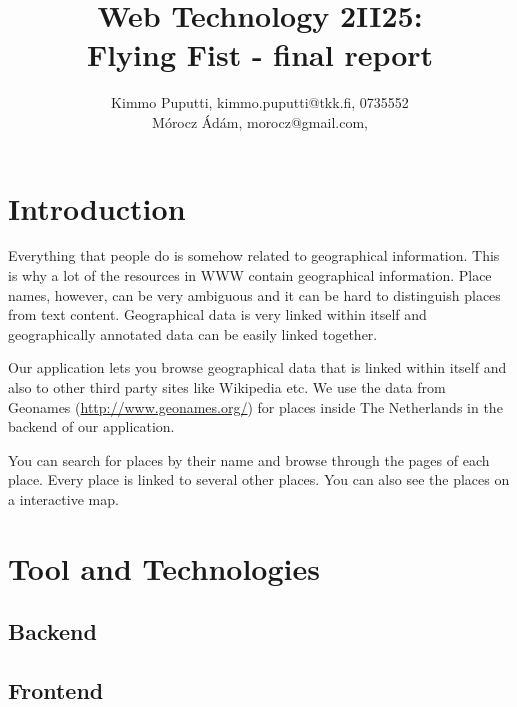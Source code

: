 \documentclass[a4paper,12pt]{article}
\title{Web Technology 2II25:\\Flying Fist - final report}
\author{Kimmo Puputti, kimmo.puputti@tkk.fi, 0735552\\M\'orocz \'Ad\'am, morocz@gmail.com, }
\begin{document}
\maketitle

\section{Introduction}

Everything that people do is somehow related to geographical
information. This is why a lot of the resources in WWW contain
geographical information. Place names, however, can be very ambiguous
and it can be hard to distinguish places from text
content. Geographical data is very linked within itself and
geographically annotated data can be easily linked together.

Our application lets you browse geographical data that is linked
within itself and also to other third party sites like Wikipedia
etc. We use the data from Geonames (\url{http://www.geonames.org/})
for places inside The Netherlands in the backend of our application.

You can search for places by their name and browse through the pages
of each place. Every place is linked to several other places. You can
also see the places on a interactive map.

\section{Tool and Technologies}

\subsection{Backend}



\subsection{Frontend}
\end{document}
